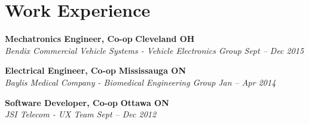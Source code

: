 \section*{Work Experience}
    \vspace{\postsubhead}
    \textbf{Mechatronics Engineer, Co-op}
    \hfill
    \textbf{Cleveland OH}\\
    \textit{Bendix Commercial Vehicle Systems - Vehicle Electronics Group}
    \hfill
    \textit{Sept -- Dec 2015}
    \vspace{\interlist}

    \textbf{Electrical Engineer, Co-op}
    \hfill
    \textbf{Mississauga ON}\\
    \textit{Baylis Medical Company - Biomedical Engineering Group}
    \hfill
    \textit{Jan -- Apr 2014}
    \vspace{\interlist}
    
    \textbf{Software Developer, Co-op}
    \hfill
    \textbf{Ottawa ON}\\
    \textit{JSI Telecom - UX Team}
    \hfill
    \textit{Sept -- Dec 2012}
    \vspace{\interlist}
    

